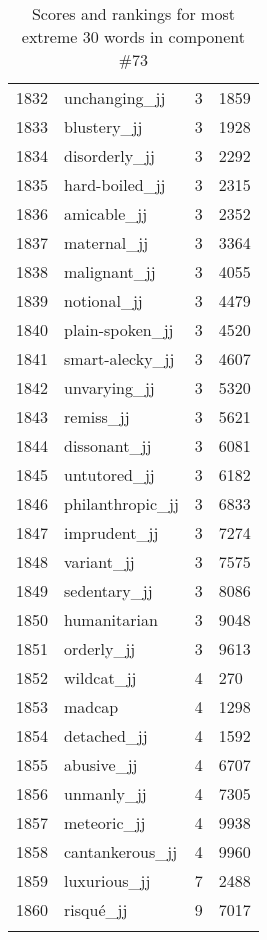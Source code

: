 \begin{longtable}[!htbp]{| rlr@{.}l |}
    1832 & unchanging\_jj & 3 & 1859 \\
    1833 & blustery\_jj & 3 & 1928 \\
    1834 & disorderly\_jj & 3 & 2292 \\
    1835 & hard-boiled\_jj & 3 & 2315 \\
    1836 & amicable\_jj & 3 & 2352 \\
    1837 & maternal\_jj & 3 & 3364 \\
    1838 & malignant\_jj & 3 & 4055 \\
    1839 & notional\_jj & 3 & 4479 \\
    1840 & plain-spoken\_jj & 3 & 4520 \\
    1841 & smart-alecky\_jj & 3 & 4607 \\
    1842 & unvarying\_jj & 3 & 5320 \\
    1843 & remiss\_jj & 3 & 5621 \\
    1844 & dissonant\_jj & 3 & 6081 \\
    1845 & untutored\_jj & 3 & 6182 \\
    1846 & philanthropic\_jj & 3 & 6833 \\
    1847 & imprudent\_jj & 3 & 7274 \\
    1848 & variant\_jj & 3 & 7575 \\
    1849 & sedentary\_jj & 3 & 8086 \\
    1850 & humanitarian & 3 & 9048 \\
    1851 & orderly\_jj & 3 & 9613 \\
    1852 & wildcat\_jj & 4 & 270 \\
    1853 & madcap & 4 & 1298 \\
    1854 & detached\_jj & 4 & 1592 \\
    1855 & abusive\_jj & 4 & 6707 \\
    1856 & unmanly\_jj & 4 & 7305 \\
    1857 & meteoric\_jj & 4 & 9938 \\
    1858 & cantankerous\_jj & 4 & 9960 \\
    1859 & luxurious\_jj & 7 & 2488 \\
    1860 & risqué\_jj & 9 & 7017 \\
    \hline
    \caption{Scores and rankings for most extreme 30 words in component \#73} \\
\end{longtable}
